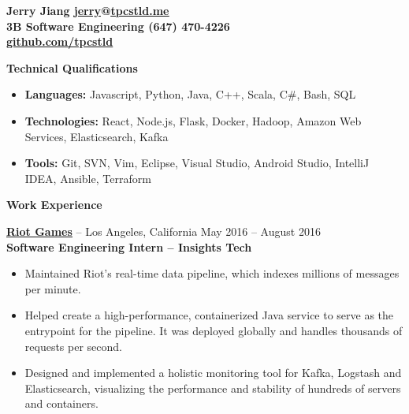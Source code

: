 \documentclass{letter}
\begin{document}
  \thispagestyle{empty}


{\bfseries
  {\Large Jerry Jiang} \hfill \href{mailto:jerry@tpcstld.me}{\uline{jerry}}@\href{http://tpcstld.me}{\uline{tpcstld.me}} \\
  3B Software Engineering \hfill (647) 470-4226 \\
\null \hfill \href{https://github.com/tpcstld}{\uline{github.com/tpcstld}}} \\
\null \hrulefill

{\bfseries \Large Technical Qualifications}
\vspace{-3mm}
\begin{itemize}
    \item {\bfseries Languages:}
        Javascript, Python, Java, C++, Scala, C\#, Bash, SQL
    \item {\bfseries Technologies:}
        React, Node.js, Flask, Docker, Hadoop, Amazon Web Services,
        Elasticsearch, Kafka
    \item {\bfseries Tools:}
        Git, SVN, Vim, Eclipse, Visual Studio, Android Studio, IntelliJ IDEA,
        Ansible, Terraform
\end{itemize}

{\bfseries \Large Work Experience}

\vspace{-1.5mm}
{\bfseries \href{https://riotgames.com}{\uline{Riot Games}}} -- Los Angeles,
California \hfill May 2016 -- August 2016\\
{\bfseries Software Engineering Intern -- Insights Tech}
\vspace{-3mm}
\begin{itemize}
    \item Maintained Riot's real-time data pipeline, which indexes millions of
      messages per minute.
    \item Helped create a high-performance, containerized Java service to serve
      as the entrypoint for the pipeline. It was deployed globally and
      handles thousands of requests per second.
    \item Designed and implemented a holistic monitoring tool for Kafka,
      Logstash and Elasticsearch, visualizing the performance and
      stability of hundreds of servers and containers.
\end{itemize}
\end{document}
